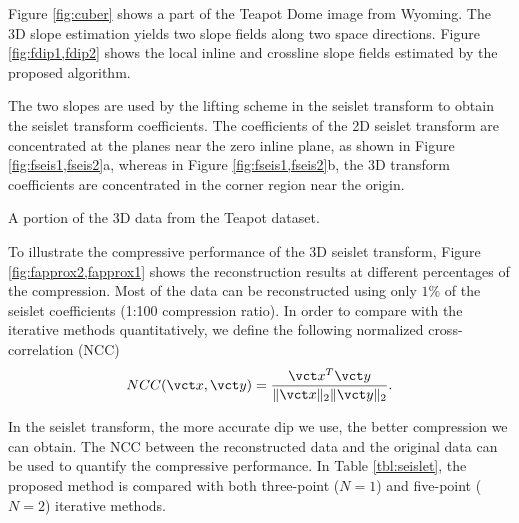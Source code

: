 Figure \ref{fig:cuber} shows a part of the Teapot Dome image from Wyoming.
The 3D slope estimation yields two slope fields along two space directions.
Figure \ref{fig:fdip1,fdip2} shows the local inline 
and crossline slope fields estimated by the proposed algorithm.

The two slopes are used by the lifting scheme 
in the seislet transform to obtain the seislet transform coefficients.
The coefficients of the 2D seislet transform 
are concentrated at the planes near the zero inline plane,
as shown in Figure \ref{fig:fseis1,fseis2}a,
whereas in Figure \ref{fig:fseis1,fseis2}b, 
the 3D transform coefficients are concentrated 
in the corner region near the origin.

{A portion of the 3D data from the Teapot dataset.}

To illustrate the compressive performance of the 3D seislet transform,
Figure \ref{fig:fapprox2,fapprox1} shows the reconstruction results 
at different percentages of the compression.
Most of the data can be reconstructed using only $1\%$ of 
the seislet coefficients (1:100 compression ratio).
In order to compare with the iterative methods quantitatively,
we define the following normalized cross-correlation (NCC)
\begin{equation}
NCC(\vct x, \vct y) = \frac{\vct x^T\vct y}{\|\vct x\|_2\|\vct y\|_2}.
\end{equation}







In the seislet transform, 
the more accurate dip we use, the better compression we can obtain.
The NCC between the reconstructed data and the original data
can be used to quantify the compressive performance.
In Table \ref{tbl:seislet}, the proposed method 
is compared with both three-point ($N=1$) and five-point ($N=2$) iterative methods.

